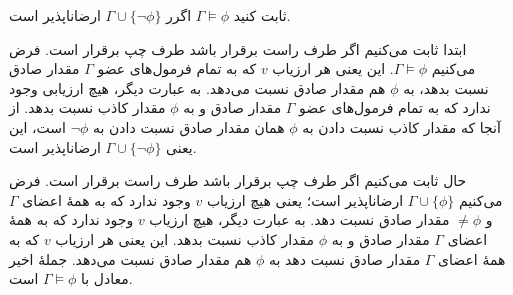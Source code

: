 ثابت کنید $\Gamma\models\phi$ اگرر $\Gamma\cup\{\neg\phi\}$ ارضاناپذیر است.
\begin{ans}
ابتدا ثابت می‌کنیم اگر طرف راست برقرار باشد طرف چپ برقرار است. فرض می‌کنیم $\Gamma\models\phi$. این یعنی هر ارزیاب $v$ که به تمام فرمول‌های عضو $\Gamma$ مقدار صادق نسبت بدهد، به $\phi$ هم مقدار صادق نسبت می‌دهد. به عبارت دیگر، هیچ ارزیابی وجود ندارد که به تمام فرمول‌های عضو $\Gamma$ مقدار صادق و به $\phi$ مقدار کاذب نسبت بدهد. از آنجا که مقدار کاذب نسبت دادن به $\phi$ همان مقدار صادق نسبت دادن به $\neg\phi$ است، این یعنی $\Gamma\cup\{\neg\phi\}$ ارضاناپذیر است.

حال ثابت می‌کنیم اگر طرف چپ برقرار باشد طرف راست برقرار است. فرض می‌کنیم $\Gamma\cup\{\phi\}$ ارضاناپذیر است؛ یعنی هیچ ارزیاب $v$ وجود ندارد که به همهٔ اعضای $\Gamma$ و $\neq\phi$ مقدار صادق نسبت دهد. به عبارت دیگر، هیچ ارزیاب $v$ وجود ندارد که به همهٔ اعضای $\Gamma$ مقدار صادق و به $\phi$ مقدار کاذب نسبت بدهد. این یعنی هر ارزیاب $v$ که به همهٔ اعضای $\Gamma$ مقدار صادق نسبت دهد به $\phi$ هم مقدار صادق نسبت می‌دهد. جملهٔ اخیر معادل با $\Gamma\models\phi$ است.
\end{ans}
